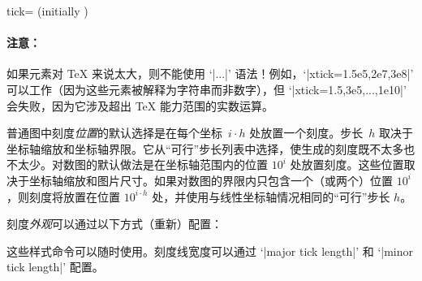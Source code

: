 \begin{pgfplotsxykey}{\x tick= (initially \marg{})%
}
    \paragraph{注意：}

    如果元素对 \TeX{} 来说太大，则不能使用 `|...|' 语法！例如，`|xtick={1.5e5,2e7,3e8}|' 可以工作（因为这些元素被解释为字符串而非数字），但 `|xtick={1.5,3e5,...,1e10}|' 会失败，因为它涉及超出 \TeX{} 能力范围的实数运算。
        \vspace*{0.3cm}

    \noindent 普通图中刻度\emph{位置}的默认选择是在每个坐标~$i\cdot h$ 处放置一个刻度。步长~$h$ 取决于坐标轴缩放和坐标轴界限。它从“可行”步长列表中选择，使生成的刻度既不太多也不太少。对数图的默认做法是在坐标轴范围内的位置 $10^i$ 处放置刻度。这些位置取决于坐标轴缩放和图片尺寸。如果对数图的界限内只包含一个（或两个）位置 $10^i$，则刻度将放置在位置 $10^{i\cdot h}$ 处，并使用与线性坐标轴情况相同的“可行”步长 $h$。

    \noindent 刻度\emph{外观}可以通过以下方式（重新）配置：
\begin{codeexample}
\end{codeexample}

    这些样式命令可以随时使用。刻度线宽度可以通过 `|major tick length|' 和 `|minor tick length|' 配置。
\begin{codeexample}[]
\end{codeexample}

\begin{codeexample}[]
\end{codeexample}
\end{pgfplotsxykey}

